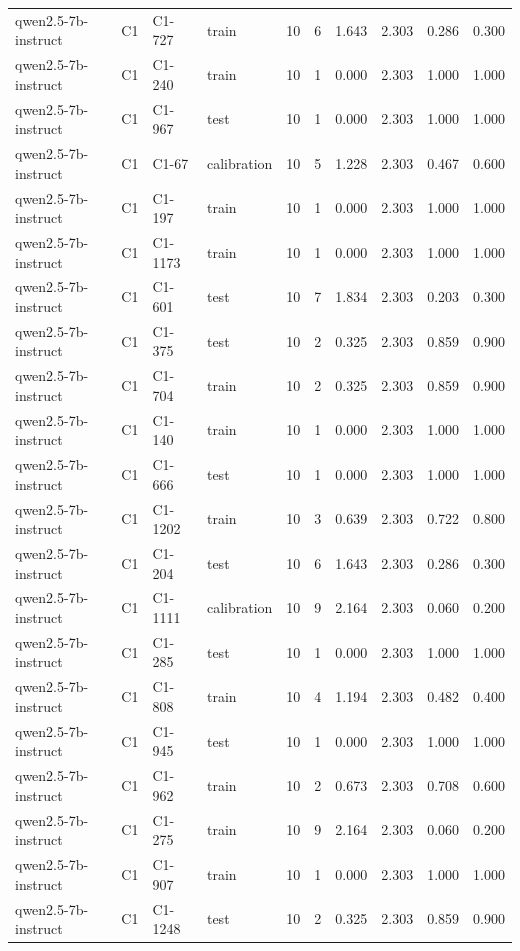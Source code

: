\begin{table}
\begin{tabular}{llllrrrrrr}
qwen2.5-7b-instruct & C1 & C1-727 & train & 10 & 6 & 1.643 & 2.303 & 0.286 & 0.300 \\
qwen2.5-7b-instruct & C1 & C1-240 & train & 10 & 1 & 0.000 & 2.303 & 1.000 & 1.000 \\
qwen2.5-7b-instruct & C1 & C1-967 & test & 10 & 1 & 0.000 & 2.303 & 1.000 & 1.000 \\
qwen2.5-7b-instruct & C1 & C1-67 & calibration & 10 & 5 & 1.228 & 2.303 & 0.467 & 0.600 \\
qwen2.5-7b-instruct & C1 & C1-197 & train & 10 & 1 & 0.000 & 2.303 & 1.000 & 1.000 \\
qwen2.5-7b-instruct & C1 & C1-1173 & train & 10 & 1 & 0.000 & 2.303 & 1.000 & 1.000 \\
qwen2.5-7b-instruct & C1 & C1-601 & test & 10 & 7 & 1.834 & 2.303 & 0.203 & 0.300 \\
qwen2.5-7b-instruct & C1 & C1-375 & test & 10 & 2 & 0.325 & 2.303 & 0.859 & 0.900 \\
qwen2.5-7b-instruct & C1 & C1-704 & train & 10 & 2 & 0.325 & 2.303 & 0.859 & 0.900 \\
qwen2.5-7b-instruct & C1 & C1-140 & train & 10 & 1 & 0.000 & 2.303 & 1.000 & 1.000 \\
qwen2.5-7b-instruct & C1 & C1-666 & test & 10 & 1 & 0.000 & 2.303 & 1.000 & 1.000 \\
qwen2.5-7b-instruct & C1 & C1-1202 & train & 10 & 3 & 0.639 & 2.303 & 0.722 & 0.800 \\
qwen2.5-7b-instruct & C1 & C1-204 & test & 10 & 6 & 1.643 & 2.303 & 0.286 & 0.300 \\
qwen2.5-7b-instruct & C1 & C1-1111 & calibration & 10 & 9 & 2.164 & 2.303 & 0.060 & 0.200 \\
qwen2.5-7b-instruct & C1 & C1-285 & test & 10 & 1 & 0.000 & 2.303 & 1.000 & 1.000 \\
qwen2.5-7b-instruct & C1 & C1-808 & train & 10 & 4 & 1.194 & 2.303 & 0.482 & 0.400 \\
qwen2.5-7b-instruct & C1 & C1-945 & test & 10 & 1 & 0.000 & 2.303 & 1.000 & 1.000 \\
qwen2.5-7b-instruct & C1 & C1-962 & train & 10 & 2 & 0.673 & 2.303 & 0.708 & 0.600 \\
qwen2.5-7b-instruct & C1 & C1-275 & train & 10 & 9 & 2.164 & 2.303 & 0.060 & 0.200 \\
qwen2.5-7b-instruct & C1 & C1-907 & train & 10 & 1 & 0.000 & 2.303 & 1.000 & 1.000 \\
qwen2.5-7b-instruct & C1 & C1-1248 & test & 10 & 2 & 0.325 & 2.303 & 0.859 & 0.900 \\

\end{tabular}
\end{table}
